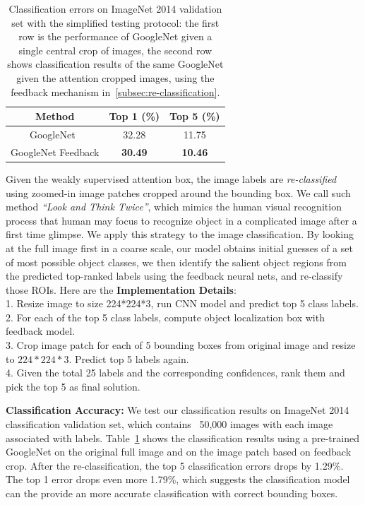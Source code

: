 \begin{table}
\centering
\small
\begin{tabular}{|c|c|c|}
\hline
Method & Top 1 (\%) & Top 5 (\%) \\ \hline
GoogleNet~\cite{Szegedy2014Going} & 32.28 & 11.75 \\ \hline
GoogleNet Feedback & \textbf{30.49} & \textbf{10.46} \\ \hline
\end{tabular}
\caption{
Classification errors on ImageNet 2014 validation set with the simplified testing protocol: the first row is the performance of  GoogleNet given a single central crop of images, the second row shows classification results of the same GoogleNet given the attention cropped images, using the feedback mechanism in~\ref{subsec:re-classification}.
}
\label{tab:reclassification_error}
\end{table}

Given the weakly supervised attention box, the image labels are {\em re-classified} using zoomed-in image patches cropped around the bounding box. We call such method {\em ``Look and Think Twice''}, which mimics the human visual recognition process that human may focus to recognize object in a complicated image after a first time glimpse. We apply this strategy to the image classification. By looking at the full image first in a coarse scale, our model obtains initial guesses of a set of most possible object classes, we then identify the salient object regions from the predicted top-ranked labels using the feedback neural nets, and re-classify those ROIs. Here are the \textbf{Implementation Details}:
\\1. Resize image to size 224*224*3, run CNN model and predict top 5 class labels.
\\2. For each of the top 5 class labels, compute object localization box with feedback model.
\\3. Crop image patch for each of 5 bounding boxes from original image and resize to $224*224*3$. Predict top 5 labels again.
\\4. Given the total 25 labels and the corresponding confidences, rank them and pick the top 5 as final solution.

\textbf{Classification Accuracy:} We test our classification results on ImageNet 2014 classification validation set, which contains ~50,000 images with each image associated with labels. Table~\ref{tab:reclassification_error} shows the classification results using a pre-trained GoogleNet on the original full image and on the image patch based on feedback crop. After the re-classification, the top 5 classification errors drops by 1.29\%. The top 1 error drops even more 1.79\%, which suggests the classification model can the provide an more accurate classification with correct bounding boxes.


